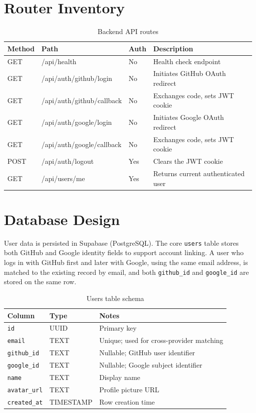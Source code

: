\documentclass[12pt,a4paper,oneside]{book}
\begin{document}
\section{Router Inventory}

\begin{table}[H]
\centering
\caption{Backend API routes}
\label{tab:backend_routes}
\begin{tabularx}{\textwidth}{lllX}
\toprule
\textbf{Method} & \textbf{Path} & \textbf{Auth} & \textbf{Description} \\
\midrule
GET  & /api/health              & No  & Health check endpoint \\
GET  & /api/auth/github/login   & No  & Initiates GitHub OAuth redirect \\
GET  & /api/auth/github/callback & No & Exchanges code, sets JWT cookie \\
GET  & /api/auth/google/login   & No  & Initiates Google OAuth redirect \\
GET  & /api/auth/google/callback & No & Exchanges code, sets JWT cookie \\
POST & /api/auth/logout         & Yes & Clears the JWT cookie \\
GET  & /api/users/me            & Yes & Returns current authenticated user \\
\bottomrule
\end{tabularx}
\end{table}

\section{Database Design}

User data is persisted in Supabase (PostgreSQL). The core \texttt{users} table stores both GitHub and Google identity fields to support account linking. A user who logs in with GitHub first and later with Google, using the same email address, is matched to the existing record by email, and both \texttt{github\_id} and \texttt{google\_id} are stored on the same row.

\begin{table}[H]
\centering
\caption{Users table schema}
\label{tab:users_schema}
\begin{tabular}{lll}
\toprule
\textbf{Column} & \textbf{Type} & \textbf{Notes} \\
\midrule
\texttt{id}           & UUID      & Primary key \\
\texttt{email}        & TEXT      & Unique; used for cross-provider matching \\
\texttt{github\_id}   & TEXT      & Nullable; GitHub user identifier \\
\texttt{google\_id}   & TEXT      & Nullable; Google subject identifier \\
\texttt{name}         & TEXT      & Display name \\
\texttt{avatar\_url}  & TEXT      & Profile picture URL \\
\texttt{created\_at}  & TIMESTAMP & Row creation time \\
\bottomrule
\end{tabular}
\end{table}
\end{document}
